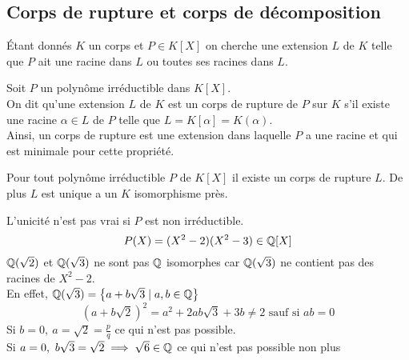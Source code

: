 \subsection{Corps de rupture et corps de décomposition}

Étant donnés $K$ un corps et $P\in K[X]$ on cherche une extension $L$ de $K$ telle que $P$ ait une racine dans $L$ ou toutes ses racines dans $L$.



\begin{definition}
	Soit $P$ un polynôme irréductible dans $K[X]$.\\
	On dit qu'une extension $L$ de $K$ est un corps de rupture de $P$ sur $K$ s'il existe une
	racine $\alpha \in L$ de $P$ telle que $L = K[\alpha] = K(\alpha)$. \\
	Ainsi, un corps de rupture est une extension dans laquelle $P$ a une racine et
	qui est minimale pour cette propriété.
\end{definition}

\begin{theorem}
	Pour tout polynôme irréductible $P$ de $K[X]$ il existe un corps de rupture $L$.
	De plus $L$ est unique a un $K$ isomorphisme près.
\end{theorem}


\begin{remarque}
	L'unicité n'est pas vrai si $P$ est non irréductible.
	$$ P(X) = (X^2 - 2) (X^2 - 3) \in \mathbb{Q}[X]$$
	$\mathbb{Q}(\sqrt{2})$ et $\mathbb{Q}(\sqrt{3})$ ne sont pas $\mathbb{Q}$ isomorphes car
	$\mathbb{Q}(\sqrt{3})$ ne contient pas des racines de $X^2-2$.\\
	En effet, $\mathbb{Q}(\sqrt{3}) = \left\{  a + b\sqrt{3} \mid a,b \in \mathbb{Q}  \right\}$
	$$ (a + b\sqrt{2}) ^2 = a^2 + 2ab\sqrt{3}  + 3b \neq 2 \text{ sauf si } ab = 0$$
	Si $b=0, \ a = \sqrt{2} = \frac{p}{q}$ ce qui n'est pas possible. \\
	Si $a=0, \ b\sqrt{3} = \sqrt{2} \implies \sqrt{6} \in \mathbb{Q} $ ce qui n'est pas possible non plus
\end{remarque}


